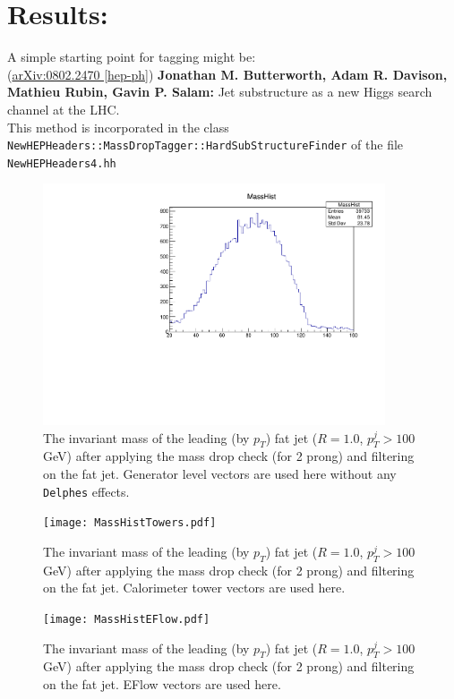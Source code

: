 \section{Results:}

A simple starting point for tagging might be:\\
(\href{https://arxiv.org/pdf/0802.2470.pdf}{arXiv:0802.2470 [hep-ph]}) {\bf Jonathan M. Butterworth, Adam R. Davison, Mathieu Rubin, Gavin P. Salam:} Jet substructure as a new Higgs search channel at the LHC.\\
This method is incorporated in the class {\tt NewHEPHeaders::MassDropTagger::HardSubStructureFinder} of the file {\tt NewHEPHeaders4.hh}

\begin{figure}
	\begin{center}
		\includegraphics[width=0.9\textwidth]{MassDropTaggerResult.pdf}
		\caption{
			The invariant mass of the leading (by $p_T$) fat jet ($R=1.0$, $p_T^{j}>100$ GeV) after applying the mass drop check (for 2 prong) and filtering on the fat jet. Generator level vectors are used here without any {\tt Delphes} effects.
		}
	\end{center}
\end{figure}

\begin{figure}
	\begin{center}
		\texttt{[image: MassHistTowers.pdf]}
		\caption{
			The invariant mass of the leading (by $p_T$) fat jet ($R=1.0$, $p_T^{j}>100$ GeV) after applying the mass drop check (for 2 prong) and filtering on the fat jet. Calorimeter tower vectors are used here.
		}
	\end{center}
\end{figure}

\begin{figure}
	\begin{center}
		\texttt{[image: MassHistEFlow.pdf]}
		\caption{
			The invariant mass of the leading (by $p_T$) fat jet ($R=1.0$, $p_T^{j}>100$ GeV) after applying the mass drop check (for 2 prong) and filtering on the fat jet. EFlow vectors are used here.
		}
	\end{center}
\end{figure}